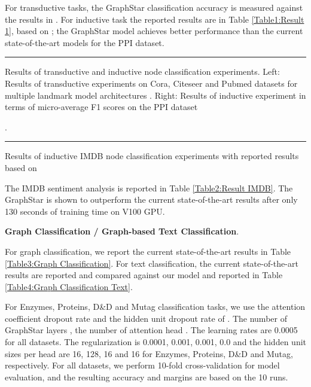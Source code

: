 \documentclass{article}
\begin{document}
For transductive tasks, the GraphStar classification accuracy is measured against the results in \cite{gao2018large,velivckovic2017graph,DBLP:journals/corr/abs-1902-07153,DBLP:journals/corr/abs-1811-02798,zhang2018gaan}. For inductive task the reported results are in Table \ref{Table1:Result 1}, based on \cite{gao2018large, hamilton2017inductive,velivckovic2017graph,xu2018representation}; the GraphStar model achieves better performance than the current state-of-the-art models for the PPI dataset.

\begin{table}[!ht]
\centering
{}
\rule{\linewidth}{0cm}
\caption{\label{Table1:Result 1} Results of transductive and inductive node classification experiments. Left: Results of transductive experiments on Cora, Citeseer and Pubmed datasets for multiple landmark model architectures \cite{gao2018large,velivckovic2017graph,DBLP:journals/corr/abs-1902-07153,DBLP:journals/corr/abs-1811-02798,zhang2018gaan}. Right: Results of inductive experiment in terms of micro-average F1 scores on the PPI dataset \cite{gao2018large, hamilton2017inductive,velivckovic2017graph,xu2018representation}}.
\end{table}
\vspace*{-\baselineskip}
\begin{table}[!ht]
\centering
{}
\rule{\linewidth}{0cm}
\caption{\label{Table2:Result IMDB} Results of inductive IMDB node classification experiments with reported results based on \cite{johnson2016supervised,sachan2018revisiting,2019arXiv190412848X}}
\end{table}

The IMDB sentiment analysis is reported in Table \ref{Table2:Result IMDB}. The GraphStar is shown to outperform the current state-of-the-art results after only 130 seconds of training time on V100 GPU.

\textbf{Graph Classification / Graph-based Text Classification}. 

For graph classification, we report the current state-of-the-art results in Table \ref{Table3:Graph Classification}. For text classification, the current state-of-the-art results are reported and compared against our model\cite{verma2018graph,ying2018hierarchical,li2019semi} and reported in Table \ref{Table4:Graph Classification Text}.

For Enzymes, Proteins, D\&D and Mutag classification tasks, we use the attention coefficient dropout rate and the hidden unit dropout rate of . The number of GraphStar layers , the number of attention head . The learning rates are 0.0005 for all datasets. The  regularization is 0.0001, 0.001, 0.001, 0.0 and the hidden unit sizes per head are 16, 128, 16 and 16 for Enzymes, Proteins, D\&D and Mutag, respectively. For all datasets, we perform 10-fold cross-validation for model evaluation, and the resulting accuracy and margins are based on the 10 runs.
\end{document}
